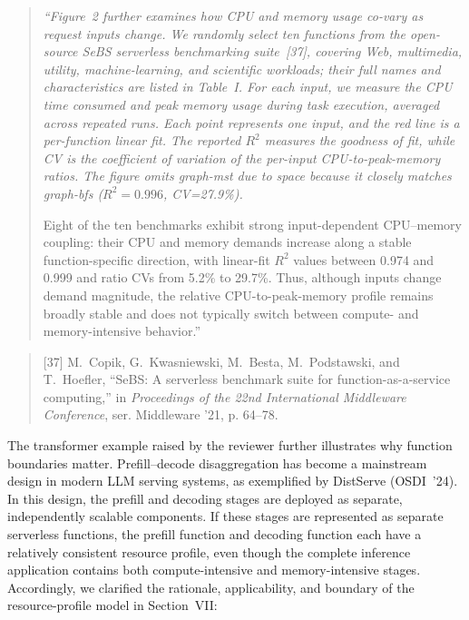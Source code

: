 \documentclass[11pt]{article}
\newenvironment{revisionquote}{\begin{quote}\itshape}{\end{quote}}
\begin{document}
\begin{revisionquote}
``Figure~2 further examines how CPU and memory usage co-vary as request inputs change. We randomly select ten functions from the open-source SeBS serverless benchmarking suite~[37], covering Web, multimedia, utility, machine-learning, and scientific workloads; their full names and characteristics are listed in Table~I. For each input, we measure the CPU time consumed and peak memory usage during task execution, averaged across repeated runs. Each point represents one input, and the red line is a per-function linear fit. The reported $R^2$ measures the goodness of fit, while CV is the coefficient of variation of the per-input CPU-to-peak-memory ratios. The figure omits graph-mst due to space because it closely matches graph-bfs ($R^2=0.996$, CV=27.9\%).

Eight of the ten benchmarks exhibit strong input-dependent CPU--memory coupling: their CPU and memory demands increase along a stable function-specific direction, with linear-fit $R^2$ values between 0.974 and 0.999 and ratio CVs from 5.2\% to 29.7\%. Thus, although inputs change demand magnitude, the relative CPU-to-peak-memory profile remains broadly stable and does not typically switch between compute- and memory-intensive behavior.''
\end{revisionquote}

\begin{quote}\small
[37] M.~Copik, G.~Kwasniewski, M.~Besta, M.~Podstawski, and T.~Hoefler, ``SeBS: A serverless benchmark suite for function-as-a-service computing,'' in \emph{Proceedings of the 22nd International Middleware Conference}, ser. Middleware '21, p. 64--78.
\end{quote}

The transformer example raised by the reviewer further illustrates why function boundaries matter. Prefill--decode disaggregation has become a mainstream design in modern LLM serving systems, as exemplified by DistServe (OSDI~'24). In this design, the prefill and decoding stages are deployed as separate, independently scalable components. If these stages are represented as separate serverless functions, the prefill function and decoding function each have a relatively consistent resource profile, even though the complete inference application contains both compute-intensive and memory-intensive stages. Accordingly, we clarified the rationale, applicability, and boundary of the resource-profile model in Section~VII:
\end{document}
